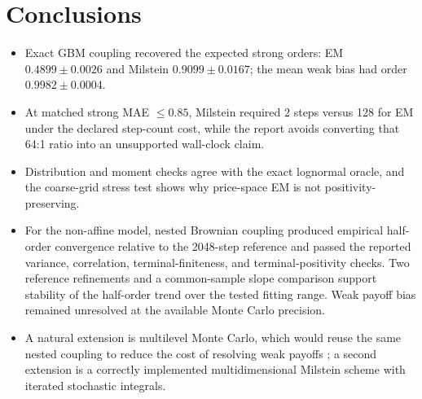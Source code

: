 \documentclass[11pt,a4paper]{article}
\theoremstyle{definition}
\theoremstyle{remark}
\begin{document}
\section{Conclusions}\label{sec:conclusion}
\begin{itemize}[leftmargin=2em]
  \item Exact GBM coupling recovered the expected strong orders: EM
  $0.4899\pm0.0026$ and Milstein $0.9099\pm0.0167$; the mean weak bias had order
  $0.9982\pm0.0004$.
  \item At matched strong MAE $\le0.85$, Milstein required 2 steps versus 128
  for EM under the declared step-count cost, while the report avoids converting
  that 64:1 ratio into an unsupported wall-clock claim.
  \item Distribution and moment checks agree with the exact lognormal oracle,
  and the coarse-grid stress test shows why price-space EM is not
  positivity-preserving.
  \item For the non-affine model, nested Brownian coupling produced empirical
  half-order convergence relative to the 2048-step reference and passed the
  reported variance, correlation, terminal-finiteness, and terminal-positivity
  checks.  Two reference refinements and a common-sample slope comparison
  support stability of the half-order trend over the tested fitting range.
  Weak payoff bias remained
  unresolved at the available Monte Carlo precision.
  \item A natural extension is multilevel Monte Carlo, which would reuse the
  same nested coupling to reduce the cost of resolving weak payoffs
  \cite{giles2008}; a second extension is a correctly implemented
  multidimensional Milstein scheme with iterated stochastic integrals.
\end{itemize}
\end{document}
